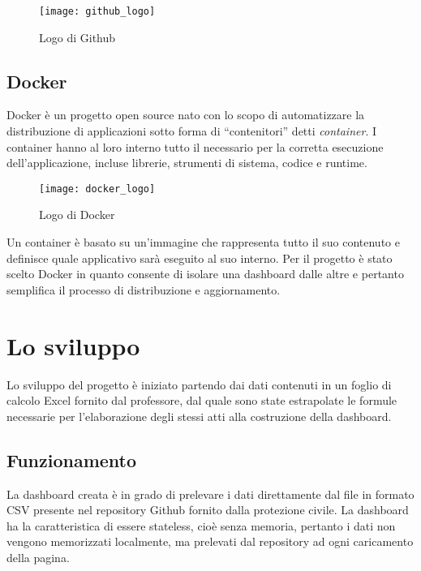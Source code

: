 \begin{figure}[htp]
    \centering
    \texttt{[image: github\_logo]}
    \caption{Logo di Github}
\end{figure}

\subsection{Docker}
Docker è un progetto open source nato con lo scopo di automatizzare la distribuzione di applicazioni sotto forma di “contenitori” detti \emph{container}.
I container hanno al loro interno tutto il necessario per la corretta esecuzione dell’applicazione, incluse librerie, strumenti di sistema, codice e runtime.

\begin{figure}[htp]
    \centering
    \texttt{[image: docker\_logo]}
    \caption{Logo di Docker}
\end{figure}

Un container è basato su un’immagine che rappresenta tutto il suo contenuto e definisce quale applicativo sarà eseguito al suo interno. 
Per il progetto è stato scelto Docker in quanto consente di isolare una dashboard dalle altre e pertanto semplifica il processo di distribuzione e aggiornamento.

\section{Lo sviluppo}
Lo sviluppo del progetto è iniziato partendo dai dati contenuti in un foglio di calcolo Excel fornito dal professore, dal quale sono state estrapolate le formule necessarie per l’elaborazione degli stessi atti alla costruzione della dashboard.

\subsection{Funzionamento}
La dashboard creata è in grado di prelevare i dati direttamente dal file in formato CSV presente nel repository Github fornito dalla protezione civile.
La dashboard ha la caratteristica di essere stateless, cioè senza memoria, pertanto i dati non vengono memorizzati localmente, ma prelevati dal repository ad ogni caricamento della pagina.

